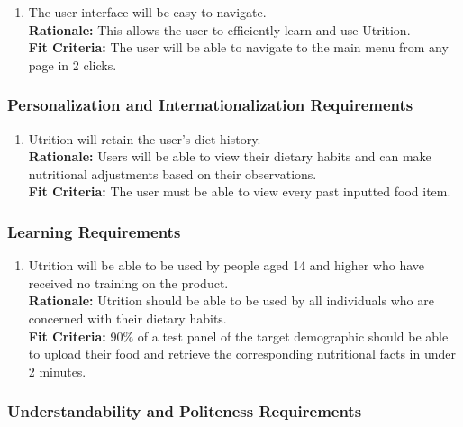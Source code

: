 \documentclass[12pt]{article}
\begin{document}
\begin{enumerate}[{UH}1. ]
	\item The user interface will be easy to navigate. \\
	\textbf{Rationale:} This allows the user to efficiently learn and use Utrition.\\
	\textbf{Fit Criteria:} The user will be able to navigate to the main menu from any page in 2 clicks.
\end{enumerate}

\subsubsection{Personalization and Internationalization Requirements}

\begin{enumerate}[{UH}2. ] 
	\item Utrition will retain the user’s diet history.\\
	\textbf{Rationale:} Users will be able to view their dietary habits and can make nutritional adjustments based on their observations.\\
	\textbf{Fit Criteria:} The user must be able to view every past inputted food item.
	
\end{enumerate}

\subsubsection{Learning Requirements}

\begin{enumerate}[{UH}3. ] 
	\item Utrition will be able to be used by people aged 14 and higher who have received no training on the product.\\
	\textbf{Rationale:} Utrition should be able to be used by all individuals who are concerned with their dietary habits.\\
	\textbf{Fit Criteria:} 90\% of a test panel of the target demographic should be able to upload their food and retrieve the corresponding nutritional facts in under 2 minutes.
\end{enumerate}

\subsubsection{Understandability and Politeness Requirements}
\end{document}
